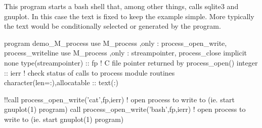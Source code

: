 This program starts a bash shell that, among other things, calls sqlite3 and gnuplot. In this case the text is fixed to keep the example simple. More typically the text would be conditionally selected or generated by the program. \begin{DoxyVerb}program demo_M_process
use M_process ,only : process_open_write, process_writeline
use M_process ,only : streampointer, process_close
implicit none
type(streampointer) :: fp                     ! C file pointer returned by process_open()
integer :: ierr                               ! check status of calls to process module routines
character(len=:),allocatable :: text(:)

!!call process_open_write('cat',fp,ierr)       ! open process to write to (ie. start gnuplot(1) program)
call process_open_write('bash',fp,ierr)       ! open process to write to (ie. start gnuplot(1) program)


\end{DoxyVerb}

